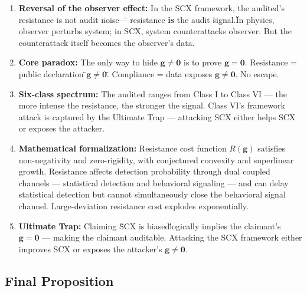\documentclass[12pt,a4paper]{article}
\theoremstyle{remark}
\newcommand{\g}{\mathbf{g}}
\begin{document}
\begin{enumerate}[label=(\arabic*)]
    \item \textbf{Reversal of the observer effect:} In the SCX framework, the audited's resistance is not audit \"noise\" — resistance \textbf{is} the audit \"signal.\" In physics, observer perturbs system; in SCX, system counterattacks observer. But the counterattack itself becomes the observer's data.
    
    \item \textbf{Core paradox:} The only way to hide $ \g \neq \mathbf{0} $ is to prove $ \g = \mathbf{0} $. Resistance = public declaration \"$ \g \neq \mathbf{0} $\". Compliance = data exposes $ \g \neq \mathbf{0} $. No escape.
    
    \item \textbf{Six-class spectrum:} The audited ranges from Class I to Class VI — the more intense the resistance, the stronger the signal. Class VI's framework attack is captured by the Ultimate Trap — attacking SCX either helps SCX or exposes the attacker.
    
    \item \textbf{Mathematical formalization:} Resistance cost function $ R(\g) $ satisfies non-negativity and zero-rigidity, with conjectured convexity and superlinear growth. Resistance affects detection probability through dual coupled channels — statistical detection and behavioral signaling — and can delay statistical detection but cannot simultaneously close the behavioral signal channel. Large-deviation resistance cost explodes exponentially.
    
    \item \textbf{Ultimate Trap:} Claiming \"SCX is biased\" logically implies the claimant's $ \g = \mathbf{0} $ — making the claimant auditable. Attacking the SCX framework either improves SCX or exposes the attacker's $ \g \neq \mathbf{0} $.
\end{enumerate}

\subsection{}
\subsection{Final Proposition}
\end{document}
